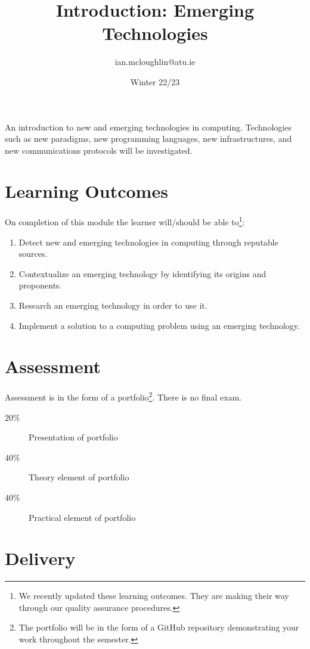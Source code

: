 \documentclass[a4paper]{tufte-handout}
\title{Introduction: Emerging Technologies}
\author{ian.mcloughlin@atu.ie}
\date{Winter 22/23}
\begin{document}
\maketitle

An introduction to new and emerging technologies in computing.
Technologies such as new paradigms, new programming languages, new infrastructures, and new communications protocols will be investigated.


\section{Learning Outcomes}

On completion of this module the learner will/should be able to\footnote{We recently updated these learning outcomes. They are making their way through our quality assurance procedures.}:

\begin{enumerate}
\item Detect new and emerging technologies in computing through reputable sources.
\item Contextualize an emerging technology by identifying its origins and proponents.
\item Research an emerging technology in order to use it.
\item Implement a solution to a computing problem using an emerging technology.
\end{enumerate}


\section{Assessment}

Assessment is in the form of a portfolio\footnote{The portfolio will be in the form of a GitHub repository demonstrating your work throughout the semester.}. There is no final exam.

\begin{description}
  \item[$20\%$] Presentation of portfolio
  \item[$40\%$] Theory element of portfolio
  \item[$40\%$]	Practical element of portfolio
\end{description}

 
\section{Delivery}
\end{document}
